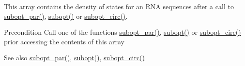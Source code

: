 This array contains the density of states for an R\+NA sequences after a call to \mbox{\hyperlink{group__subopt__wuchty_gaa1e1e7031a948ebcb39a9d58d1e9842c}{subopt\+\_\+par()}}, \mbox{\hyperlink{group__subopt__wuchty_ga700f662506a233e42dd7fda74fafd40e}{subopt()}} or \mbox{\hyperlink{group__subopt__wuchty_ga8634516e4740e0b6c9a46d2bae940340}{subopt\+\_\+circ()}}.

\begin{DoxyPrecond}{Precondition}
Call one of the functions \mbox{\hyperlink{group__subopt__wuchty_gaa1e1e7031a948ebcb39a9d58d1e9842c}{subopt\+\_\+par()}}, \mbox{\hyperlink{group__subopt__wuchty_ga700f662506a233e42dd7fda74fafd40e}{subopt()}} or \mbox{\hyperlink{group__subopt__wuchty_ga8634516e4740e0b6c9a46d2bae940340}{subopt\+\_\+circ()}} prior accessing the contents of this array 
\end{DoxyPrecond}
\begin{DoxySeeAlso}{See also}
\mbox{\hyperlink{group__subopt__wuchty_gaa1e1e7031a948ebcb39a9d58d1e9842c}{subopt\+\_\+par()}}, \mbox{\hyperlink{group__subopt__wuchty_ga700f662506a233e42dd7fda74fafd40e}{subopt()}}, \mbox{\hyperlink{group__subopt__wuchty_ga8634516e4740e0b6c9a46d2bae940340}{subopt\+\_\+circ()}} 
\end{DoxySeeAlso}
